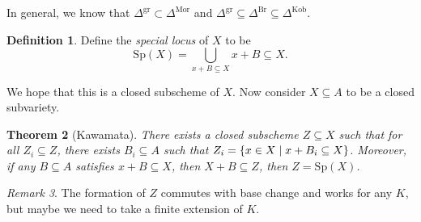 \documentclass[leqno, openany]{memoir}
\newtheorem{thm}{Theorem}[section]
\theoremstyle{definition}
\newtheorem{defn}[thm]{Definition}
\theoremstyle{remark}
\newtheorem{rmk}[thm]{Remark}
\theoremstyle{plain}
\theoremstyle{definition}
\theoremstyle{remark}
\newcommand{\mr}[1]{\mathrm{#1}}
\begin{document}
In general, we know that $\Delta^{\mr{gr}} \subset \Delta^{\mr{Mor}}$ and $\Delta^{\mr{gr}} \subseteq \Delta^{\mr{Br}} \subseteq \Delta^{\mr{Kob}}$.

\begin{defn}
    Define the \textit{special locus} of $X$ to be
    \[ \mr{Sp}(X) = \bigcup_{x + B \subseteq X} x + B \subseteq X. \]
\end{defn}

We hope that this is a closed subscheme of $X$. Now consider $X \subseteq A$ to be a closed subvariety.

\begin{thm}[Kawamata]
    There exists a closed subscheme $Z \subseteq X$ such that for all $Z_i \subseteq Z$, there exists $B_i \subseteq A$ such that $Z_i = \qty{x \in X \mid x + B_i \subseteq X}$. Moreover, if any $B \subseteq A$ satisfies $x + B \subseteq X$, then $X + B \subseteq Z$, then $Z = \mr{Sp}(X)$.
\end{thm}

\begin{rmk}
    The formation of $Z$ commutes with base change and works for any $K$, but maybe we need to take a finite extension of $K$.
\end{rmk}
\end{document}
